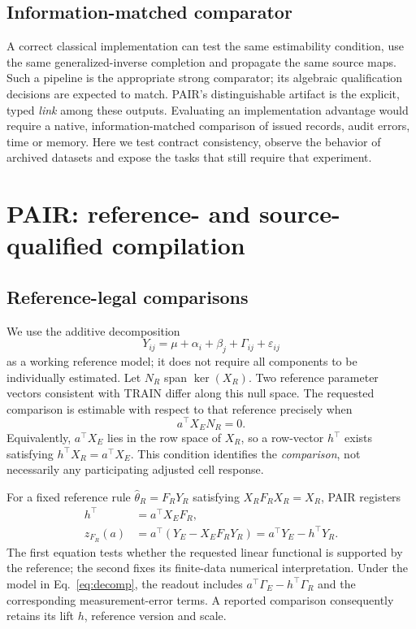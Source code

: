 \documentclass[preprint,11pt,times,number,sort&compress]{elsarticle}
\begin{document}
\subsection{Information-matched comparator}
A correct classical implementation can test the same estimability condition, use the same generalized-inverse completion and propagate the same source maps. Such a pipeline is the appropriate strong comparator; its algebraic qualification decisions are expected to match. PAIR's distinguishable artifact is the explicit, typed \emph{link} among these outputs. Evaluating an implementation advantage would require a native, information-matched comparison of issued records, audit errors, time or memory. Here we test contract consistency, observe the behavior of archived datasets and expose the tasks that still require that experiment.

\section{PAIR: reference- and source-qualified compilation}\label{sec:method}
\subsection{Reference-legal comparisons}
We use the additive decomposition
\begin{equation}
Y_{ij}=\mu+\alpha_i+\beta_j+\Gamma_{ij}+\varepsilon_{ij}
\label{eq:decomp}
\end{equation}
as a working reference model; it does not require all components to be individually estimated. Let $N_R$ span $\ker(X_R)$. Two reference parameter vectors consistent with TRAIN differ along this null space. The requested comparison is estimable with respect to that reference precisely when
\begin{equation}
a^\top X_EN_R=0.
\label{eq:estimable}
\end{equation}
Equivalently, $a^\top X_E$ lies in the row space of $X_R$, so a row-vector $h^\top$ exists satisfying $h^\top X_R=a^\top X_E$. This condition identifies the \emph{comparison}, not necessarily any participating adjusted cell response.

For a fixed reference rule $\widehat\theta_R=F_RY_R$ satisfying $X_RF_RX_R=X_R$, PAIR registers
\begin{equation}
\begin{aligned}
h^\top&=a^\top X_EF_R,\\
z_{F_R}(a)&=a^\top(Y_E-X_EF_RY_R)
           =a^\top Y_E-h^\top Y_R.
\end{aligned}
\label{eq:readout}
\end{equation}
The first equation tests whether the requested linear functional is supported by the reference; the second fixes its finite-data numerical interpretation. Under the model in Eq.~\ref{eq:decomp}, the readout includes $a^\top\Gamma_E-h^\top\Gamma_R$ and the corresponding measurement-error terms. A reported comparison consequently retains its lift $h$, reference version and scale.
\end{document}
